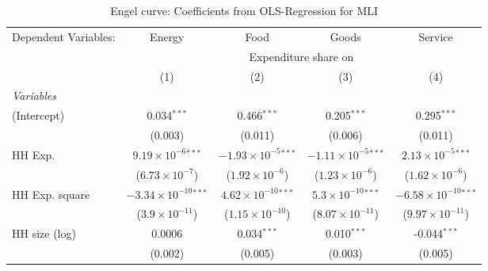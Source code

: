 
\begin{table}[htbp!]
   \centering
   \small
   \begin{adjustbox}{width = 1\textwidth, max height = 0.95\textheight, center}
      \begin{threeparttable}[b]
         \caption{\label{tab:Engel_parametric_MLI} Engel curve: Coefficients from OLS-Regression for MLI}
         \begin{tabular}{lcccc}
            \tabularnewline \midrule \midrule
            Dependent Variables: & Energy                          & Food                           & Goods                          & Service\\  
             & \multicolumn{4}{c}{Expenditure share on} \\ 
                                 & (1)                             & (2)                            & (3)                            & (4)\\  
            \midrule
            \emph{Variables}\\
            (Intercept)          & 0.034$^{***}$                   & 0.466$^{***}$                  & 0.205$^{***}$                  & 0.295$^{***}$\\   
                                 & (0.003)                         & (0.011)                        & (0.006)                        & (0.011)\\   
            HH Exp.              & $9.19\times 10^{-6}$$^{***}$    & $-1.93\times 10^{-5}$$^{***}$  & $-1.11\times 10^{-5}$$^{***}$  & $2.13\times 10^{-5}$$^{***}$\\    
                                 & ($6.73\times 10^{-7}$)          & ($1.92\times 10^{-6}$)         & ($1.23\times 10^{-6}$)         & ($1.62\times 10^{-6}$)\\    
            HH Exp. square       & $-3.34\times 10^{-10}$$^{***}$  & $4.62\times 10^{-10}$$^{***}$  & $5.3\times 10^{-10}$$^{***}$   & $-6.58\times 10^{-10}$$^{***}$\\    
                                 & ($3.9\times 10^{-11}$)          & ($1.15\times 10^{-10}$)        & ($8.07\times 10^{-11}$)        & ($9.97\times 10^{-11}$)\\    
            HH size (log)        & 0.0006                          & 0.034$^{***}$                  & 0.010$^{***}$                  & -0.044$^{***}$\\   
                                 & (0.002)                         & (0.005)                        & (0.003)                        & (0.005)\\   

\end{tabular}
\end{threeparttable}
\end{adjustbox}
\end{table}

